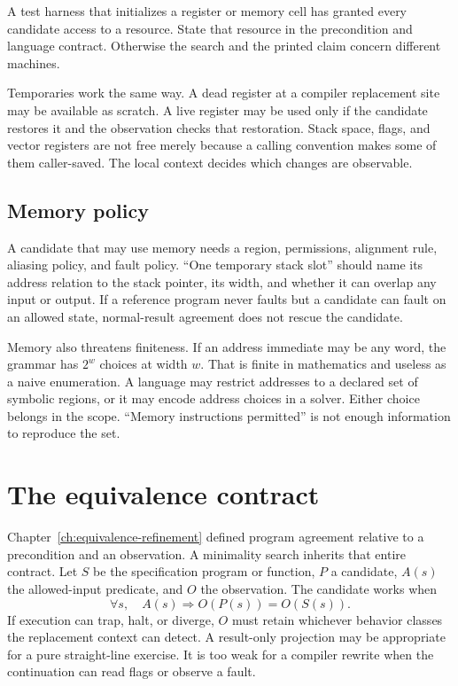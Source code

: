 \begin{warning}[title={Do not smuggle a constant through the harness}]
A test harness that initializes a register or memory cell has granted every
candidate access to a resource. State that resource in the precondition and
language contract. Otherwise the search and the printed claim concern
different machines.
\end{warning}

Temporaries work the same way. A dead register at a compiler replacement site
may be available as scratch. A live register may be used only if the candidate
restores it and the observation checks that restoration. Stack space, flags,
and vector registers are not free merely because a calling convention makes
some of them caller-saved. The local context decides which changes are
observable.

\subsection{Memory policy}

A candidate that may use memory needs a region, permissions, alignment rule,
aliasing policy, and fault policy. ``One temporary stack slot'' should name
its address relation to the stack pointer, its width, and whether it can
overlap any input or output. If a reference program never faults but a
candidate can fault on an allowed state, normal-result agreement does not
rescue the candidate.

Memory also threatens finiteness. If an address immediate may be any word,
the grammar has \(2^w\) choices at width \(w\). That is finite in mathematics
and useless as a naive enumeration. A language may restrict addresses to a
declared set of symbolic regions, or it may encode address choices in a
solver. Either choice belongs in the scope. ``Memory instructions permitted''
is not enough information to reproduce the set.

\section{The equivalence contract}

Chapter~\ref{ch:equivalence-refinement} defined program agreement relative to
a precondition and an observation. A minimality search inherits that entire
contract. Let \(S\) be the specification program or function, \(P\) a
candidate, \(A(s)\) the allowed-input predicate, and \(O\) the observation.
The candidate works when
\[
  \forall s,\quad A(s)\Longrightarrow O(P(s))=O(S(s)).
\]
If execution can trap, halt, or diverge, \(O\) must retain whichever behavior
classes the replacement context can detect. A result-only projection may be
appropriate for a pure straight-line exercise. It is too weak for a compiler
rewrite when the continuation can read flags or observe a fault.

